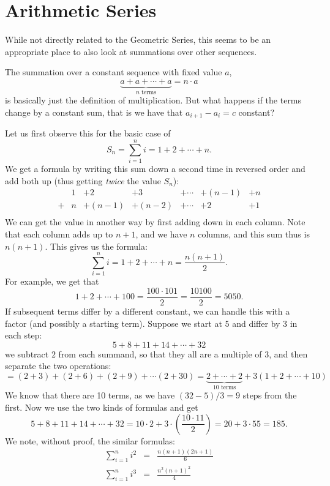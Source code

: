 \section{Arithmetic Series}

While not directly related to the Geometric Series, this seems to be an
appropriate place to also look at summations over other sequences.

The summation over a constant sequence with fixed value $a$,
\[
\underbrace{a+a+\cdots +a}_{\mbox{$n$ terms}}=n\cdot a
\]
is basically just the definition of multiplication. But what happens if the
terms change by a constant sum, that is we have that $a_{i+1}-a_i=c$
constant?

Let us first observe this for the basic case of 
\[
S_n=\sum_{i=1}^n i=1+2+\cdots+n.
\]
We get a formula by writing this sum down a second time in reversed order
and add both up (thus getting {\em twice} the value $S_n$):
\[
\begin{array}{ccccccc}
&1&+2&+3&+\cdots&+(n-1)&+n\\
+&n&+(n-1)&+(n-2)&+\cdots&+2&+1\\
\end{array}
\]
We can get the value in another way by first adding down in each column.
Note that each column adds up to $n+1$, and we have $n$ columns, and this
sum thus is $n(n+1)$. This gives us the formula:
\[
\sum_{i=1}^n i=1+2+\cdots+n=\frac{n(n+1)}{2}.
\]
For example, we get that
\[
1+2+\cdots+100=\frac{100\cdot 101}{2}=\frac{10100}{2}=5050.
\]
If subsequent terms differ by a different constant, we can handle this with
a factor (and possibly a starting term). Suppose we start at 5 and differ by
3 in each step:
\[
5+8+11+14+\cdots+32
\]
we subtract $2$ from each summand, so that they all are a multiple of $3$,
and then separate the two operations:
\[
=(2+3)+(2+6)+(2+9)+\cdots(2+30)=\underbrace{2+\cdots+2}_{\mbox{$10$ terms}}
+3\left(1+2+\cdots+10\right)
\]
We know that there are 10 terms, as we have $(32-5)/3=9$ steps from the
first. Now we use the two kinds of formulas and get
\[
5+8+11+14+\cdots+32=10\cdot 2+ 3\cdot\left(\frac{10\cdot
11}{2}\right)=20+3\cdot 55=185.
\]
We note, without proof, the similar formulas:
\begin{eqnarray*}
\sum_{i=1}^n i^2&=&\frac{n(n+1)(2n+1)}{6}\\
\sum_{i=1}^n i^3&=&\frac{n^2(n+1)^2}{4}\\
\end{eqnarray*}

